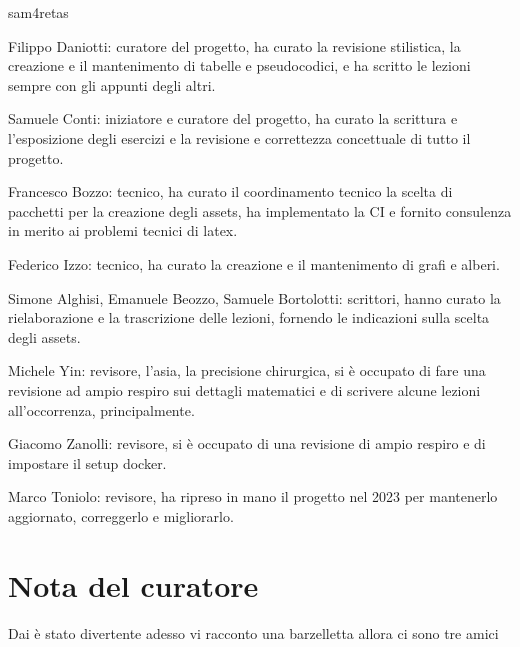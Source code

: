 \documentclass[class=book, crop=false, oneside, 12pt]{standalone}
\begin{document}
\begin{labeling}{sam4retas}
    \item[p!ps] Filippo Daniotti: curatore del progetto, ha curato la revisione stilistica, la creazione e il mantenimento di tabelle e pseudocodici, e ha scritto le lezioni sempre con gli appunti degli altri.
    \item[sam4retas] Samuele Conti: iniziatore e curatore del progetto, ha curato la scrittura e l'esposizione degli esercizi e la revisione e correttezza concettuale di tutto il progetto.
    \item[frab0zzo] Francesco Bozzo: tecnico, ha curato il coordinamento tecnico la scelta di pacchetti per la creazione degli assets, ha implementato la CI e fornito consulenza in merito ai problemi tecnici di latex.
    \item[f1zzo] Federico Izzo: tecnico, ha curato la creazione e il mantenimento di grafi e alberi.
    \item[t0k3n\$] Simone Alghisi, Emanuele Beozzo, Samuele Bortolotti: scrittori, hanno curato la rielaborazione e la trascrizione delle lezioni, fornendo le indicazioni sulla scelta degli assets.
    \item[ch!n4] Michele Yin: revisore, l'asia, la precisione chirurgica, si è occupato di fare una revisione ad ampio respiro sui dettagli matematici e di scrivere alcune lezioni all'occorrenza, principalmente.
    \item[j4bb] Giacomo Zanolli: revisore, si è occupato di una revisione di ampio respiro e di impostare il setup docker.
    \item[Toniolo-Marco] Marco Toniolo: revisore, ha ripreso in mano il progetto nel 2023 per mantenerlo aggiornato, correggerlo e migliorarlo.
\end{labeling}  

\section*{Nota del curatore}
Dai è stato divertente adesso vi racconto una barzelletta allora ci sono tre amici
\end{document}
